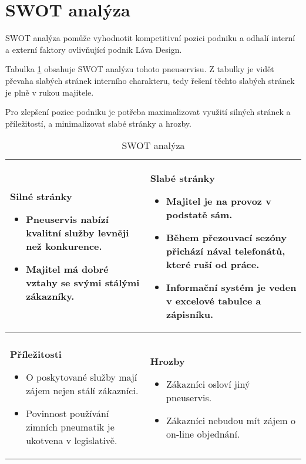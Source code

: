 \section{SWOT analýza}
SWOT analýza pomůže vyhodnotit kompetitivní pozici podniku a odhalí interní a externí faktory ovlivňující podnik Láva Design. 

Tabulka \ref{tab:SWOT} obsahuje SWOT analýzu tohoto pneuservisu. Z tabulky je vidět převaha slabých stránek interního charakteru, tedy řešení těchto slabých stránek je plně v rukou majitele.

Pro zlepšení pozice podniku je potřeba maximalizovat využití silných stránek a příležitostí, a minimalizovat slabé stránky a hrozby. 

\begin{table}[h!]
    \centering
    \begin{tabular}{p{}|p{}}
        \textbf{Silné stránky}
        \begin{itemize}
            \item Pneuservis nabízí kvalitní služby levněji než konkurence.
            \item Majitel má dobré vztahy se svými stálými zákazníky.
        \end{itemize}
        &
        \textbf{Slabé stránky}
        \begin{itemize}
            \item Majitel je na provoz v podstatě sám.
            \item Během přezouvací sezóny přichází nával telefonátů, které ruší od práce.
            \item Informační systém je veden v excelové tabulce a zápisníku.
        \end{itemize}
        \\\hline \\[-1ex]
        \textbf{Příležitosti}
        \begin{itemize}
            \item O poskytované služby mají zájem nejen stálí zákazníci.
            \item Povinnost používání zimních pneumatik je ukotvena v legislativě.
        \end{itemize}
        & 
        \textbf{Hrozby}
        \begin{itemize}
            \item Zákazníci osloví jiný pneuservis.
            \item Zákazníci nebudou mít zájem o on-line objednání.
        \end{itemize}
    \end{tabular}
    \caption{SWOT analýza}
    \label{tab:SWOT}
\end{table}
\FloatBarrier
